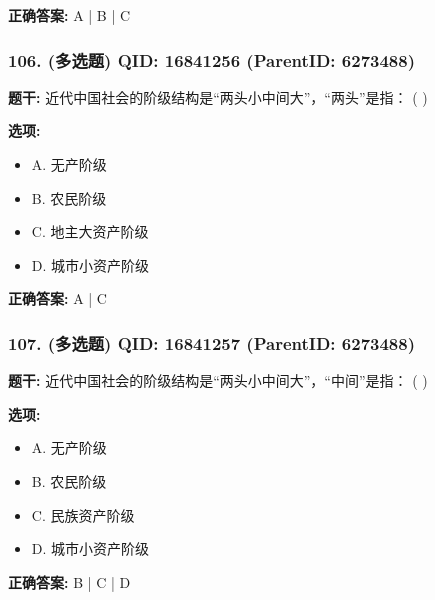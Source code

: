 \documentclass[12pt,UTF8]{ctexart}
\begin{document}
\textbf{正确答案:}
A | B | C

\vspace{0.3em}\hrulefill\vspace{0.7em}

\subsubsection*{106. (多选题) \small QID: 16841256 (ParentID: 6273488)}

\textbf{题干:}
近代中国社会的阶级结构是“两头小中间大”，“两头”是指： ( )



\textbf{选项:}
\begin{itemize}[leftmargin=*]

  \item A. 无产阶级

  \item B. 农民阶级

  \item C. 地主大资产阶级

  \item D. 城市小资产阶级

\end{itemize}

\textbf{正确答案:}
A | C

\vspace{0.3em}\hrulefill\vspace{0.7em}

\subsubsection*{107. (多选题) \small QID: 16841257 (ParentID: 6273488)}

\textbf{题干:}
近代中国社会的阶级结构是“两头小中间大”，“中间”是指： ( )



\textbf{选项:}
\begin{itemize}[leftmargin=*]

  \item A. 无产阶级

  \item B. 农民阶级

  \item C. 民族资产阶级

  \item D. 城市小资产阶级

\end{itemize}

\textbf{正确答案:}
B | C | D
\end{document}
